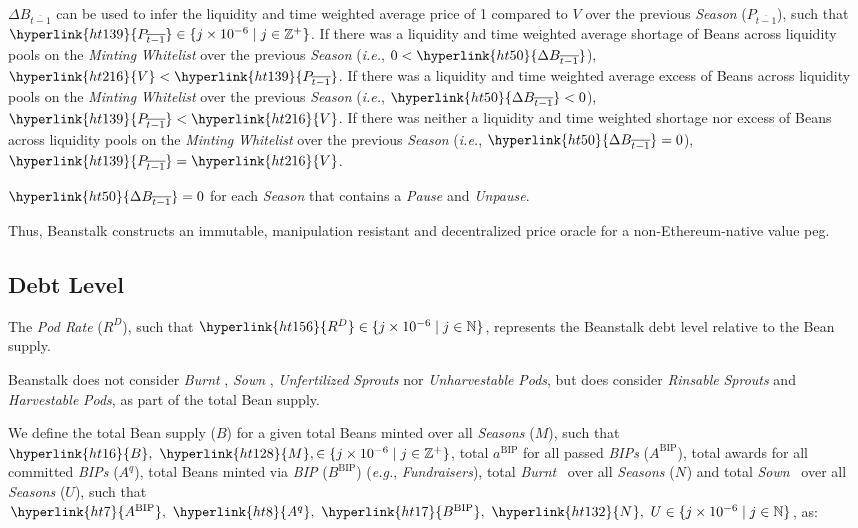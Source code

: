\documentclass[tikz]{article}
\newcommand{\term}[1]{\textsl{#1}}
\newcommand{\Bean}{} %
\newcommand{\bean}{} %
\begin{document}
\hyperlink{ht50}{$\Delta B_{\overline{t-1}}$} can be used to infer the liquidity and time weighted average price of \Bean1 compared to \hyperlink{ht216}{$V$} over the previous \term{Season} (\hyperlink{ht139}{$P_{\overline{t-1}}$}), such that $\hyperlink{ht139}{P_{\overline{t-1}}} \in \{j \times 10^{-6} \mid j \in \mathbb{Z}^{+} \}$. If there was a liquidity and time weighted average shortage of Beans across liquidity pools on the \term{Minting} \term{Whitelist} over the previous \term{Season} (\term{i.e.}, $0 < \hyperlink{ht50}{\Delta B_{\overline{t-1}}}$), $\hyperlink{ht216}{V} < \hyperlink{ht139}{P_{\overline{t-1}}}$. If there was a liquidity and time weighted average excess of Beans across liquidity pools on the \term{Minting} \term{Whitelist} over the previous \term{Season} (\term{i.e.}, $\hyperlink{ht50}{\Delta B_{\overline{t-1}}} < 0$), $\hyperlink{ht139}{P_{\overline{t-1}}} < \hyperlink{ht216}{V}$. If there was neither a liquidity and time weighted shortage nor excess of Beans across liquidity pools on the \term{Minting} \term{Whitelist} over the previous \term{Season} (\term{i.e.}, $\hyperlink{ht50}{\Delta B_{\overline{t-1}}} = 0$), $\hyperlink{ht139}{P_{\overline{t-1}}} = \hyperlink{ht216}{V}$. 

$\hyperlink{ht50}{\Delta B_{\overline{t-1}}} = 0$ for each \term{Season} that contains a \term{Pause} and \term{Unpause}.

Thus, Beanstalk constructs an immutable, manipulation resistant and decentralized price oracle for a non-Ethereum-native value peg.


\subsection{Debt Level}

The \term{Pod Rate} (\hyperlink{ht156}{$R^D$}), such that $\hyperlink{ht156}{R^D} \in \{j \times 10^{-6} \mid j \in \mathbb{N} \}$, represents the Beanstalk debt level relative to the Bean supply.

Beanstalk does not consider \term{Burnt} \Bean, \term{Sown} \Bean, \term{Unfertilized} \term{Sprouts} nor \term{Unharvestable} \term{Pods}, but does consider \term{Rinsable} \term{Sprouts} and \term{Harvestable} \term{Pods}, as part of the total Bean supply.

We define the total Bean supply (\hyperlink{ht16}{$B$}) for a given total Beans minted over all \term{Seasons} (\hyperlink{ht128}{$M$}), such that $\hyperlink{ht16}{B},\ \hyperlink{ht128}{M}, \in \{j \times 10^{-6} \mid j \in \mathbb{Z}^{+} \}$, total \hyperlink{ht9}{$a^{\text{BIP}}$} for all passed \term{BIPs} (\hyperlink{ht7}{$A^{\text{BIP}}$}), total awards for all committed \term{BIPs} (\hyperlink{ht8}{$A^q$}), total Beans minted via \term{BIP} (\hyperlink{ht17}{$B^{\text{BIP}}$}) (\term{e.g.}, \term{Fundraisers}), total \term{Burnt} \Bean\ over all \term{Seasons} (\hyperlink{ht132}{$N^{\bean}$}) and total \term{Sown} \Bean\ over all \term{Seasons} (\hyperlink{ht207}{$U$}), such that $\hyperlink{ht7}{A^{\text{BIP}}},\ \hyperlink{ht8}{A^q},\ \hyperlink{ht17}{B^{\text{BIP}}},\ \hyperlink{ht132}{N^{\bean}},\ U \in \{j \times 10^{-6} \mid j \in \mathbb{N} \}$, as:
\end{document}
